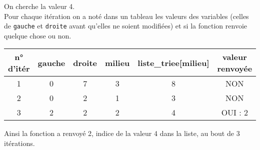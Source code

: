 On cherche la valeur 4.\\

Pour chaque itération on a noté dans un tableau les valeurs des variables (celles de \texttt{gauche} et \texttt{droite} avant qu'elles ne soient modifiées) et si la fonction renvoie quelque chose ou non.
\tabstyle[UGLiOrange]
\begin{center}
	\small
	
	\begin{tabular}{|c|c|c|c|c|c|}
		\hline
		\ccell   n° d'itér & {\ccell   gauche} & {\ccell   droite} & {\ccell   milieu} & {\ccell   liste\_triee[milieu]} & {\ccell   valeur renvoyée} \\
		\hline
		1                                                     & 0                             & 7                             & 3                             & 8                                           & NON                                    \\
		\hline
		2                                                     & 0                             & 2                             & 1                             & 3                                           & NON                                    \\
		\hline
		3                                                     & 2                             & 2                             & 2                             & 4                                           & OUI : 2                                \\
		\hline
	\end{tabular}
\end{center}
Ainsi la fonction a renvoyé 2, indice de la valeur 4 dans la liste, au bout de 3 itérations.\\

